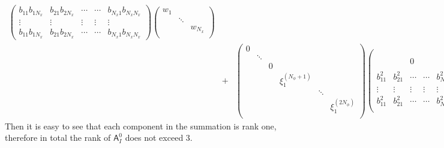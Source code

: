 \documentclass[english,reqno]{amsart}
\theoremstyle{plain}
\theoremstyle{definition} %
\newcommand{\Amat}{\mathsf{A}}
\begin{document}
\begin{eqnarray*}
\begin{pmatrix}
b_{11} b_{1N_x}   &   b_{21}b_{2N_x}    &   \cdots  & \cdots  & b_{N_x1}b_{N_xN_x} \\
 \vdots      &   \vdots        &    \vdots  &  \vdots  &   \vdots  \\
b_{11} b_{1N_x}  &      b_{21}b_{2N_x}    &   \cdots  & \cdots  & b_{N_x1}b_{N_xN_x}
\end{pmatrix} 
\begin{pmatrix}
w_1 &   &   \\
  & \ddots &  \\
&  & w_{N_x} \\
\end{pmatrix} 
\\
&+&
\begin{pmatrix} 
0 &    &  &   \\
  & \ddots &   &   & \\
 &  &  0  & &  \\
 &  &   &  \xi_1^{(N_\phi+1)}  & & \\
  &  &   &    &  \ddots& \\
    &  &   &    &  & \xi_1^{(2N_\phi)} \\
\end{pmatrix}
 \begin{pmatrix}
&  &  &  & \\
 &  &  &  & \\
 &  &0  &  & \\
 &  &    &  & \\
 b_{11}^2   &   b_{21}^2    &   \cdots  & \cdots  & b_{N_x1}^2 \\
 \vdots      &   \vdots        &    \vdots  &  \vdots  &   \vdots  \\
b_{11}^2  &     b_{21}^2  &     \cdots  & \cdots  &   b_{N_x1}^2 \\
\end{pmatrix} 
\begin{pmatrix}
w_1 &   &   \\
  & \ddots &  \\
&  & w_{N_x} \\
\end{pmatrix}   \,.
\end{eqnarray*}
Then it is easy to see that each component in the summation is rank one, therefore in total the rank of $\Amat_I^0$ does not exceed $3$.
\end{document}
